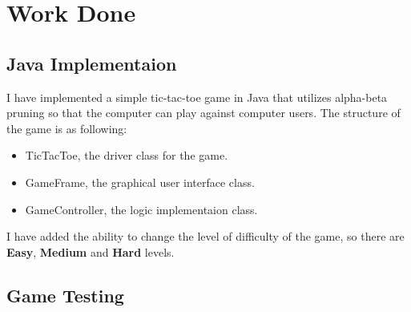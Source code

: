 \chapter{Work Done}

\section{Java Implementaion}

I have implemented a simple tic-tac-toe game in Java that utilizes alpha-beta pruning so that the computer can play against computer users. The structure of the game is as following:

\begin{itemize}
	\itemsep-0.5em 
	\item TicTacToe, the driver class for the game.
	\item GameFrame, the graphical user interface class.
	\item GameController, the logic implementaion class.
\end{itemize}

I have added the ability to change the level of difficulty of the game, so there are {\bf Easy}, {\bf Medium} and {\bf Hard} levels.

\section{Game Testing}

